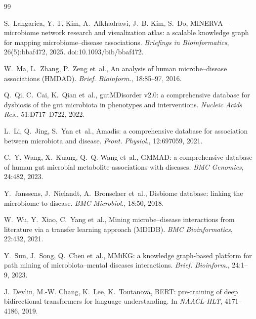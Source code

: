 \documentclass[10pt,twocolumn,letterpaper]{article}
\begin{document}
\begin{thebibliography}{99}\setlength{\itemsep}{0pt}\small

S.~Langarica, Y.-T. Kim, A.~Alkhadrawi, J.~B. Kim, S.~Do,
\newblock MINERVA---microbiome network research and visualization atlas: a
scalable knowledge graph for mapping microbiome--disease associations.
\newblock \emph{Briefings in Bioinformatics}, 26(5):bbaf472, 2025.
\newblock doi:10.1093/bib/bbaf472.

W.~Ma, L.~Zhang, P.~Zeng et~al.,
\newblock An analysis of human microbe--disease associations (HMDAD).
\newblock \emph{Brief. Bioinform.}, 18:85--97, 2016.

Q.~Qi, C.~Cai, K.~Qian et~al.,
\newblock gutMDisorder v2.0: a comprehensive database for dysbiosis of the
gut microbiota in phenotypes and interventions.
\newblock \emph{Nucleic Acids Res.}, 51:D717--D722, 2022.

L.~Li, Q.~Jing, S.~Yan et~al.,
\newblock Amadis: a comprehensive database for association between
microbiota and disease.
\newblock \emph{Front. Physiol.}, 12:697059, 2021.

C.~Y. Wang, X.~Kuang, Q.~Q. Wang et~al.,
\newblock GMMAD: a comprehensive database of human gut microbial metabolite
associations with diseases.
\newblock \emph{BMC Genomics}, 24:482, 2023.

Y.~Janssens, J.~Nielandt, A.~Bronselaer et~al.,
\newblock Disbiome database: linking the microbiome to disease.
\newblock \emph{BMC Microbiol.}, 18:50, 2018.

W.~Wu, Y.~Xiao, C.~Yang et~al.,
\newblock Mining microbe--disease interactions from literature via a
transfer learning approach (MDIDB).
\newblock \emph{BMC Bioinformatics}, 22:432, 2021.

Y.~Sun, J.~Song, Q.~Chen et~al.,
\newblock MMiKG: a knowledge graph-based platform for path mining of
microbiota--mental diseases interactions.
\newblock \emph{Brief. Bioinform.}, 24:1--9, 2023.

J.~Devlin, M.-W. Chang, K.~Lee, K.~Toutanova,
\newblock BERT: pre-training of deep bidirectional transformers for
language understanding.
\newblock In \emph{NAACL-HLT}, 4171--4186, 2019.


\end{thebibliography}
\end{document}
